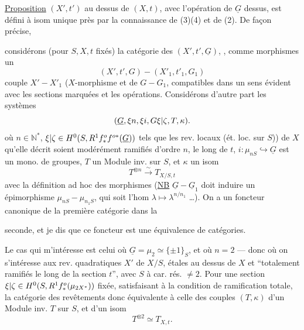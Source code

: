 \uline{Proposition} $(X',t')$ au dessus de $(X,t)$, avec l'opération de $\underline G$ dessus, est défini à isom unique près par la connaissance de (3)(4) et de (2).  De façon précise,

considérons (pour $S,X,t$ fixés) la catégorie des $(X',t',\underline G)$,  , comme morphismes un
\[
(X',t',G)\mathbin{-}(X'_1,t'_1,G_1)
\]
 couple  $X'\mathbin{-}X'_1$ ($X$-morphisme et de $G\mathbin{-}G_1$, compatibles dans un sens évident avec les sections marquées et les opérations.
Considérons d'autre part les  systèmes
\[
(\underline G,\xi n,\xi i,G\xi|\zeta,T,\kappa).
\]
où  $n\in\mathbb N^*$, $\xi|\zeta\in H^0(S,R^1f^o_*f^{o*}(\underline G))$ tels que les rev. locaux (ét. loc. sur $S$)) de $X$ qu'elle décrit soient modérément ramifiés d'ordre $n$, le long de $t$, $i:\mu_{nS}\hookrightarrow\underline G$ est un mono. de groupes, $T$ un Module inv. sur $S$, et $\kappa$ un isom
\[
T^{\otimes n}\xrightarrow{\sim}T_{X/S,t}
\]
avec la définition ad hoc des morphismes (\uline{NB}  $\underline G\mathbin{-}\underline G_1$ doit induire un épimorphisme $\mu_{nS}\mathbin{-}\mu_{n_1S}$, qui soit l'hom  $\lambda\longmapsto\lambda^{n/n_1}$ \ldots). On a un foncteur canonique de la première catégorie dans la

seconde, et je dis que ce foncteur est une équivalence de catégories.

Le cas qui m'intéresse est celui où $\underline G=\mu_2\simeq\{\pm1\}_S$, et où $n=2$ --- donc où on s'intéresse aux rev. quadratiques $X'$ de $X/S$, étales au dessus de $X$ et ``totalement ramifiés le long de la section $t$'', avec $S$ à car. rés. $\ne2$.  Pour une section $\xi|\zeta\in H^0(S,R^1f^o_*(\mu_{2X^*}))$ fixée, satisfaisant à la condition de ramification totale, la catégorie des  revêtements  donc équivalente à celle des  couples $(T,\kappa)$ d'un Module inv. $T$ sur $S$, et d'un isom
\[
T^{\otimes2}\simeq T_{X,t}.
\]

